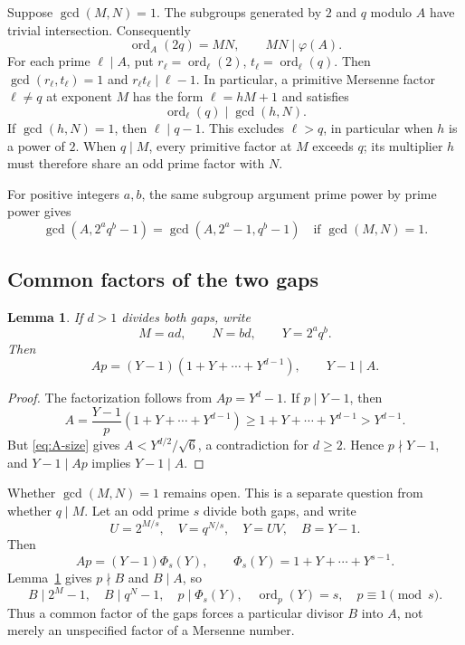 \documentclass[11pt]{article}
\newtheorem{lemma}{Lemma}
\begin{document}
Suppose $\gcd(M,N)=1$. The subgroups generated by $2$ and $q$
modulo $A$ have trivial intersection. Consequently
\[
\operatorname{ord}_A(2q)=MN,\qquad MN\mid\varphi(A).
\]
For each prime $\ell\mid A$, put
$r_\ell=\operatorname{ord}_\ell(2)$, $t_\ell=\operatorname{ord}_\ell(q)$.
Then $\gcd(r_\ell,t_\ell)=1$ and $r_\ell t_\ell\mid\ell-1$.
In particular, a primitive Mersenne factor $\ell\neq q$ at exponent $M$
has the form $\ell=hM+1$ and satisfies
\[
\boxed{\operatorname{ord}_\ell(q)\mid\gcd(h,N).}
\]
If $\gcd(h,N)=1$, then $\ell\mid q-1$. This excludes $\ell>q$,
in particular when $h$ is a power of $2$.
When $q\mid M$, every primitive factor at $M$ exceeds $q$;
its multiplier $h$ must therefore share an odd prime factor with $N$.

For positive integers $a,b$, the same subgroup argument prime power
by prime power gives
\[
\gcd(A,2^a q^b-1)=\gcd(A,2^a-1,q^b-1)
\quad\text{if }\gcd(M,N)=1.
\]

\subsection{Common factors of the two gaps}

\begin{lemma}\label{lem:divisor}
If $d>1$ divides both gaps, write
\[
M=ad,\qquad N=bd,\qquad Y=2^aq^b.
\]
Then
\[
Ap=(Y-1)(1+Y+\cdots+Y^{d-1}),\qquad Y-1\mid A.
\]
\end{lemma}
\begin{proof}
The factorization follows from $Ap=Y^d-1$. If $p\mid Y-1$, then
\[
A=\frac{Y-1}{p}(1+Y+\cdots+Y^{d-1})
 \geq 1+Y+\cdots+Y^{d-1}>Y^{d-1}.
\]
But \eqref{eq:A-size} gives $A<Y^{d/2}/\sqrt6$, a contradiction
for $d\geq2$. Hence $p\nmid Y-1$, and $Y-1\mid Ap$ implies
$Y-1\mid A$.
\end{proof}

Whether $\gcd(M,N)=1$ remains open. This is a separate question from
whether $q\mid M$.
Let an odd prime $s$ divide both gaps, and write
\[
U=2^{M/s},\quad V=q^{N/s},\quad Y=UV,\quad B=Y-1.
\]
Then
\[
Ap=(Y-1)\Phi_s(Y),\qquad
\Phi_s(Y)=1+Y+\cdots+Y^{s-1}.
\]
Lemma~\ref{lem:divisor} gives $p\nmid B$ and $B\mid A$, so
\[
B\mid2^M-1,\quad B\mid q^N-1,\quad
p\mid\Phi_s(Y),\quad \operatorname{ord}_p(Y)=s,\quad p\equiv1\pmod s.
\]
Thus a common factor of the gaps forces a particular divisor $B$ into
$A$, not merely an unspecified factor of a Mersenne number.
\end{document}
